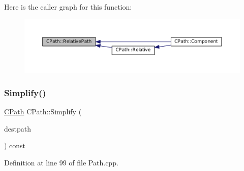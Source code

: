 Here is the caller graph for this function\+:
\nopagebreak
\begin{figure}[H]
\begin{center}
\leavevmode
\includegraphics[width=350pt]{classCPath_a76f73670ecc0a434c2f8a1ea0f1a040e_icgraph}
\end{center}
\end{figure}
\hypertarget{classCPath_aa52dcb50c943a8abc8883db5ec43a45e}{}\label{classCPath_aa52dcb50c943a8abc8883db5ec43a45e} 
\subsubsection{\texorpdfstring{Simplify()}{Simplify()}}
{\footnotesize\ttfamily \hyperlink{classCPath}{C\+Path} C\+Path\+::\+Simplify (\begin{DoxyParamCaption}\item[{const \hyperlink{classCPath}{C\+Path} \&}]{destpath }\end{DoxyParamCaption}) const}



Definition at line 99 of file Path.\+cpp.


